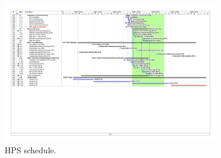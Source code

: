 \begin{figure}[ht]
\centering
\includegraphics*[angle=90,width=0.85\textwidth]{cost_schedule/ScheduleHPSV470-3.jpg} 
\caption{HPS schedule.}
\label{fig:schedulec}
\end{figure}
